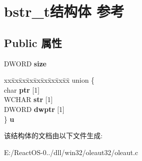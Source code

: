 \hypertarget{structbstr__t}{}\section{bstr\+\_\+t结构体 参考}
\label{structbstr__t}
\subsection*{Public 属性}
\begin{DoxyCompactItemize}
\item 
\mbox{\label{structbstr__t_aedb6738b763528739183b7bf7267aff6}} 
D\+W\+O\+RD {\bfseries size}
\item 
\mbox{\label{structbstr__t_a0e5876e5626432220080eed9ba46bf24}} 
\begin{tabbing}
xx\=xx\=xx\=xx\=xx\=xx\=xx\=xx\=xx\=\kill
union \{\\
\>char {\bfseries ptr} \mbox{[}1\mbox{]}\\
\>WCHAR {\bfseries str} \mbox{[}1\mbox{]}\\
\>DWORD {\bfseries dwptr} \mbox{[}1\mbox{]}\\
\} {\bfseries u}\\

\end{tabbing}\end{DoxyCompactItemize}


该结构体的文档由以下文件生成\+:\begin{DoxyCompactItemize}
\item 
E\+:/\+React\+O\+S-\/0../dll/win32/oleaut32/oleaut.\+c\end{DoxyCompactItemize}

